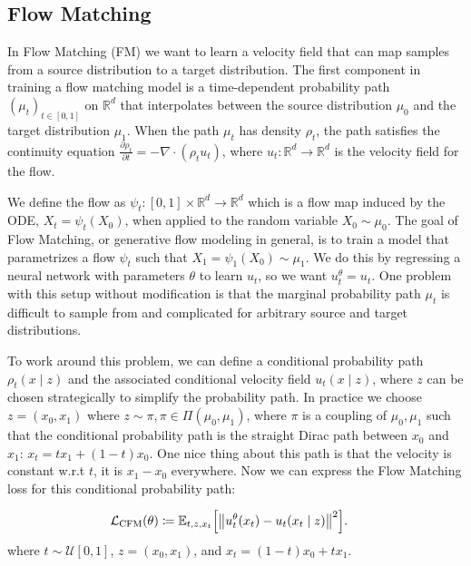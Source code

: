 \subsection{Flow Matching}
In Flow Matching (FM) we want to learn a velocity field that can map samples from a source distribution to a target distribution. The first component in training a flow matching model is a time-dependent probability path $(\mu_t)_{t\in[0,1]}$ on $\mathbb R^d$ that interpolates between the source distribution $\mu_0$ and the target distribution $\mu_1$. When the path $\mu_t$ has density $\rho_t$, the path satisfies the continuity equation $\frac{\partial \rho_t}{\partial t}=-\nabla \cdot(\rho_t u_t)$, where $u_t\colon \mathbb R^d\to \mathbb R^d$ is the velocity field for the flow.

We define the flow as $\psi_t\colon [0,1]\times \mathbb R^d\to \mathbb R^d$ which is a flow map induced by the ODE, $X_t=\psi_t(X_0)$, when applied to the random variable $X_0\sim \mu_0$. The goal of Flow Matching, or generative flow modeling in general, is to train a model that parametrizes a flow $\psi_t$ such that $X_1=\psi_1(X_0)\sim \mu_1$. We do this by regressing a neural network with parameters $\theta$ to learn $u_t$, so we want $u_t^\theta=u_t$. One problem with this setup without modification is that the marginal probability path $\mu_t$ is difficult to sample from and complicated for arbitrary source and target distributions.

To work around this problem, we can define a conditional probability path $\rho_t(x\mid z)$ and the associated conditional velocity field $u_t(x\mid z)$, where $z$ can be chosen strategically to simplify the probability path. In practice we choose $z=(x_0,x_1)$  where $z\sim \pi,\pi\in\Pi(\mu_0,\mu_1)$, where $\pi$ is a coupling of $\mu_0,\mu_1$ such that the conditional probability path is the straight Dirac path between $x_0$ and $x_1$: $x_t=tx_1+(1-t)x_0$. One nice thing about this path is that the velocity is constant w.r.t $t$, it is $x_1-x_0$ everywhere. Now we can express the Flow Matching loss for this conditional probability path:

\begin{equation}
\begin{aligned}
\mathcal L_{\mathrm{CFM}}(\theta)
&\coloneqq
\mathbb E_{t,z,x_t}
\Bigl[
\bigl\|
u_t^\theta(x_t)-u_t(x_t\mid z)
\bigr\|^2
\Bigr].
\end{aligned}
\label{eq:fm_loss}
\end{equation}
where $t\sim\mathcal U[0,1]$, $z=(x_0,x_1)$, and $x_t=(1-t)x_0+tx_1$.

